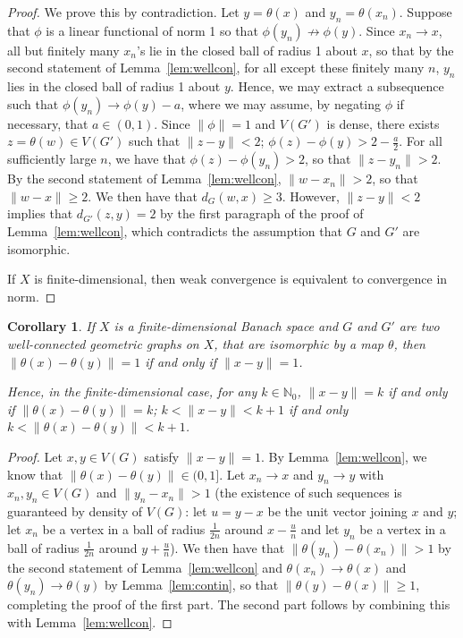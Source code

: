 \documentclass{daj}
\newtheorem{cor}[thm]{Corollary}
\newcommand{\N}{\mathbb N}
\begin{document}
\begin{proof}
We prove this by contradiction. Let $y=\theta(x)$ and $y_n=\theta(x_n)$.
Suppose that $\phi$ is a linear functional of norm 1 so that
$\phi(y_n)\not\to\phi(y)$. Since $x_n\to x$, all but finitely many $x_n$'s lie in the closed ball of
radius 1 about $x$, so that by the second statement of Lemma~\ref{lem:wellcon},
for all except these finitely many $n$, $y_n$ lies in the closed ball of radius
1 about $y$. Hence, we may extract
a subsequence such that $\phi(y_n)\to \phi(y)-a$, where we may assume,
by negating $\phi$ if necessary, that
$a\in(0,1)$. Since $\|\phi\|=1$ and $V(G')$ is dense, there exists
$z=\theta(w)\in V(G')$ such that $\|z-y\|<2$; $\phi(z)-\phi(y)>2-\frac a2$. For
all sufficiently large $n$, we have that $\phi(z)-\phi(y_n)>2$, so that $\|z-y_n\|> 2$. By the
second statement of Lemma~\ref{lem:wellcon}, $\|w-x_n\|>2$,
so that $\|w-x\|\ge 2$. We then have that $d_G(w,x)\ge 3$. However, $\|z-y\|<2$ implies
that $d_{G'}(z,y)=2$ by the first paragraph of the proof of Lemma~\ref{lem:wellcon},
which contradicts the assumption that $G$ and $G'$ are isomorphic.

If $X$ is finite-dimensional, then weak convergence is equivalent to convergence in norm.
\end{proof}

\begin{cor}\label{cor:fdim}
If $X$ is a finite-dimensional Banach space and $G$ and $G'$ are two well-connected
geometric graphs on $X$, that are isomorphic by a map $\theta$, then $\|\theta(x)-\theta(y)\|=1$
if and only if $\|x-y\|=1$.

Hence, in the finite-dimensional case,
for any $k\in\N_0$, $\|x-y\|=k$ if and only if $\|\theta(x)-\theta(y)\|=k$;
$k<\|x-y\|<k+1$ if and only $k<\|\theta(x)-\theta(y)\|<k+1$.
\end{cor}

\begin{proof}
Let $x,y\in V(G)$ satisfy $\|x-y\|=1$. By Lemma~\ref{lem:wellcon}, we know that 
$\|\theta(x)-\theta(y)\|\in(0,1]$. Let $x_n\to x$ and $y_n\to y$ with $x_n,y_n\in V(G)$
and $\|y_n-x_n\|>1$ (the existence of such sequences is guaranteed by density of $V(G)$:
let $u=y-x$ be the unit vector joining $x$ and $y$;
let $x_n$ be a vertex in a ball of radius $\frac 1{2n}$ around
$x-\frac un$ and let $y_n$ be a vertex in a ball of radius $\frac 1{2n}$ around
$y+\frac un$). We then have that $\|\theta(y_n)-\theta(x_n)\|>1$
by the second statement of Lemma~\ref{lem:wellcon}
and $\theta(x_n)\to\theta(x)$ and $\theta(y_n)\to\theta(y)$ by
Lemma~\ref{lem:contin}, so that $\|\theta(y)-\theta(x)\|\ge1$,
completing the proof of the first part. The second part follows by combining this with Lemma~\ref{lem:wellcon}.
\end{proof}
\end{document}
